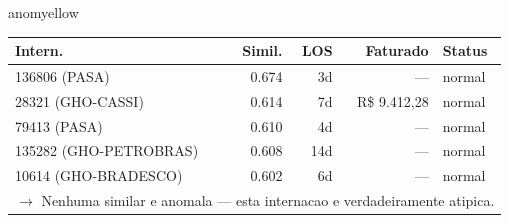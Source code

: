 \documentclass[a4paper,10pt]{article}
\begin{document}
\begin{anomalycard}[Internacao 110443 | GHO-BRADESCO | MODERADO (z=2.61)]{anomyellow}
\begin{tabular}{l r r r l}\toprule\textbf{Intern.} & \textbf{Simil.} & \textbf{LOS} & \textbf{Faturado} & \textbf{Status} \\\midrule
136806 (PASA) & 0.674 & 3d & --- & \textcolor{jcubeblue}{normal} \\
28321 (GHO-CASSI) & 0.614 & 7d & R\$ 9.412,28 & \textcolor{jcubeblue}{normal} \\
79413 (PASA) & 0.610 & 4d & --- & \textcolor{jcubeblue}{normal} \\
135282 (GHO-PETROBRAS) & 0.608 & 14d & --- & \textcolor{jcubeblue}{normal} \\
10614 (GHO-BRADESCO) & 0.602 & 6d & --- & \textcolor{jcubeblue}{normal} \\
\multicolumn{5}{l}{\textcolor{jcubeblue}{\small $\rightarrow$ Nenhuma similar e anomala --- esta internacao e verdadeiramente atipica.}} \\
\bottomrule\end{tabular}


\end{anomalycard}

\newpage
\end{document}
